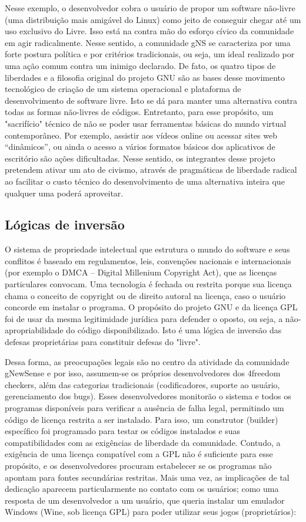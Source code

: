 Nesse exemplo, o desenvolvedor cobra o usuário de propor um software não-livre (uma distribuição mais amigável do Linux) como jeito de conseguir chegar até um uso exclusivo do Livre. Isso está na contra mão do esforço cívico da comunidade em agir radicalmente. Nesse sentido, a comunidade gNS se caracteriza por uma forte postura política e por critérios tradicionais, ou seja, um ideal realizado por uma ação comum contra um inimigo declarado. De fato, os quatro tipos de liberdades e a filosofia original do projeto GNU são as bases desse movimento tecnológico de criação de um sistema operacional e plataforma de desenvolvimento de software livre. Isto se dá para manter uma alternativa contra todas as formas não-livres de códigos. Entretanto, para esse propósito, um "sacrifício" técnico de não se poder usar ferramentas básicas do mundo virtual contemporâneo. Por exemplo, assistir aos vídeos online ou acessar sites web “dinâmicos”, ou ainda o acesso a vários formatos básicos dos aplicativos de escritório são ações dificultadas. Nesse sentido, os integrantes desse projeto pretendem ativar um ato de civismo, através de pragmáticas de liberdade radical ao facilitar o custo técnico do desenvolvimento de uma alternativa inteira que qualquer uma poderá aproveitar.

\subsection{Lógicas de inversão} \label{3.2.3}

O sistema de propriedade intelectual que estrutura o mundo do software e seus conflitos é baseado em regulamentos, leis, convenções nacionais e internacionais (por exemplo o DMCA – Digital Millenium Copyright Act), que as licenças particulares convocam. Uma tecnologia é fechada ou restrita porque sua licença chama o conceito de copyright ou de direito autoral na licença, caso o usuário concorde em instalar o programa. O propósito do projeto GNU e da licença GPL foi de usar da mesma legitimidade jurídica para defender o oposto, ou seja, a não-apropriabilidade do código disponibilizado. Isto é uma lógica de inversão das defesas proprietárias para constituir defesas do "livre". 

Dessa forma, as preocupações legais são no centro da atividade da comunidade gNewSense e por isso, assumem-se os próprios desenvolvedores dos 4freedom checkers, além das categorias tradicionais (codificadores, suporte ao usuário, gerenciamento dos bugs). Esses desenvolvedores monitorão o sistema e todos os programas disponíveis para verificar a ausência de falha legal, permitindo um código de licença restrita a ser instalado. Para isso, um construtor (builder) específico foi programado para testar os códigos instalados e suas compatibilidades com as exigências de liberdade da comunidade. Contudo, a exigência de uma licença compatível com a GPL não é suficiente para esse propósito, e os desenvolvedores procuram estabelecer se os programas não apontam para fontes secundárias restritas. Mais uma vez, as implicações de tal dedicação aparecem particularmente no contato com os usuários; como  uma resposta de um desenvolvedor a um usuário, que queria instalar um emulador Windows (Wine, sob licença GPL) para poder utilizar seus jogos (proprietários):


